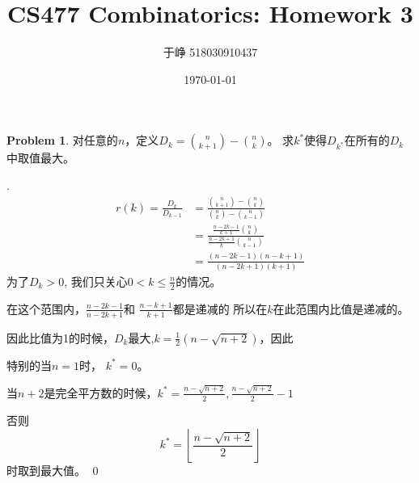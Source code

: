 \documentclass[UTF8]{ctexart}
\newenvironment{sol}
  {\par\vspace{3mm}\noindent{\it Solution}.}
  {\qed \\ \medskip}
\theoremstyle{definition}
\newtheorem{problem}{Problem}
\begin{document}
\author{于峥 518030910437}
\title{CS477 Combinatorics: Homework 3}
\date{\today}

\maketitle

\begin{problem}
对任意的$n$，定义$D_k = \binom{n}{k+1} - \binom{n}{k}$。
求$k^*$使得$D_{k^*}$在所有的$D_k$中取值最大。
\begin{sol}
    \begin{align*}
        r(k)=\frac {D_{k}} {D_{k-1}} 
        &= \frac {\binom{n}{k+1} - \binom{n}{k}} {\binom{n}{k} - \binom{n}{k-1}} \\
        &= \frac {\frac {n-2k-1} {k+1} \binom{n}{k}} {\frac {n-2k+1} {k} \binom{n}{k-1}} \\
        &= \frac {(n-2k-1)(n-k+1)} {(n-2k+1)(k+1)}
    \end{align*}
    为了$D_k > 0$, 我们只关心$0 < k \leq \frac n 2$的情况。
    
    在这个范围内，$\frac {n-2k-1} {n-2k+1}$和
    $\frac {n-k+1} {k+1}$都是递减的
    所以在$k$在此范围内比值是递减的。

    因此比值为1的时候，$D_k$最大,$k = \frac 12 (n - \sqrt{n+2})$，因此

    特别的当$n = 1$时， $k^*=0$。
    
    当$n + 2$是完全平方数的时候，$k^* = \frac {n - \sqrt{n+2}} 2, \frac {n - \sqrt{n+2}} 2-1$

    否则
    $$k^*=\left\lfloor \frac {n - \sqrt{n+2}} 2 \right\rfloor$$
    时取到最大值。
\end{sol}
\end{problem}
\end{document}

